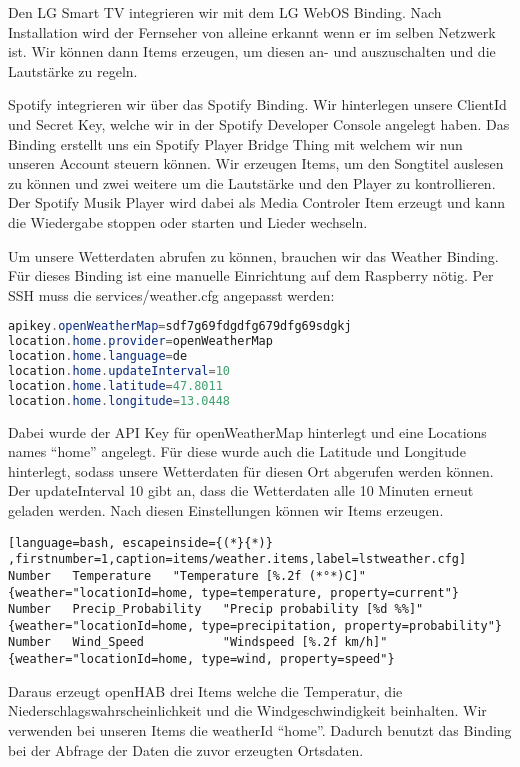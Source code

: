 		Den LG Smart TV integrieren wir mit dem LG WebOS Binding. Nach Installation wird der Fernseher von alleine erkannt wenn er im selben Netzwerk ist. Wir können dann Items erzeugen, um diesen an- und auszuschalten und die Lautstärke zu regeln.
		
		Spotify integrieren wir über das Spotify Binding. Wir hinterlegen unsere ClientId und Secret Key, welche wir in der Spotify Developer Console angelegt haben. Das Binding erstellt uns ein Spotify Player Bridge Thing mit welchem wir nun unseren Account steuern können. Wir erzeugen Items, um den Songtitel auslesen zu können und zwei weitere um die Lautstärke und den Player zu kontrollieren. Der Spotify Musik Player wird dabei als Media Controler Item erzeugt und kann die Wiedergabe stoppen oder starten und Lieder wechseln.
		
		Um unsere Wetterdaten abrufen zu können, brauchen wir das Weather Binding. Für dieses Binding ist eine manuelle Einrichtung auf dem Raspberry nötig. Per SSH muss die services/weather.cfg angepasst werden:
		
		\begin{lstlisting}[language=java,firstnumber=1,caption=services/weather.cfg,label=lstweather.cfg]
apikey.openWeatherMap=sdf7g69fdgdfg679dfg69sdgkj
location.home.provider=openWeatherMap
location.home.language=de
location.home.updateInterval=10
location.home.latitude=47.8011
location.home.longitude=13.0448
		\end{lstlisting}
		
		Dabei wurde der API Key für openWeatherMap hinterlegt und eine Locations names "`home"' angelegt. Für diese wurde auch die Latitude und Longitude hinterlegt, sodass unsere Wetterdaten für diesen Ort abgerufen werden können. Der updateInterval 10 gibt an, dass die Wetterdaten alle 10 Minuten erneut geladen werden.
		Nach diesen Einstellungen können wir Items erzeugen.
		
				\begin{lstlisting}[language=bash, escapeinside={(*}{*)} ,firstnumber=1,caption=items/weather.items,label=lstweather.cfg]
Number   Temperature   "Temperature [%.2f (*°*)C]"
{weather="locationId=home, type=temperature, property=current"}
Number   Precip_Probability   "Precip probability [%d %%]"
{weather="locationId=home, type=precipitation, property=probability"}
Number   Wind_Speed           "Windspeed [%.2f km/h]"
{weather="locationId=home, type=wind, property=speed"}
		\end{lstlisting}
		
		Daraus erzeugt openHAB drei Items welche die Temperatur, die Niederschlagswahrscheinlichkeit und die Windgeschwindigkeit beinhalten.
		Wir verwenden bei unseren Items die weatherId "`home"'. Dadurch benutzt das Binding bei der Abfrage der Daten die zuvor erzeugten Ortsdaten.
		
